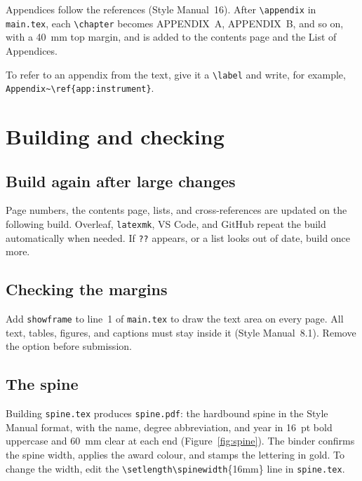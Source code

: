 \documentclass[11pt,a4paper]{article}
\newcommand\cmd[1]{\texttt{\textbackslash #1}}
\newcommand\file[1]{\texttt{#1}}
\begin{document}
Appendices follow the references (Style Manual~16). After \cmd{appendix} in
\file{main.tex}, each \cmd{chapter} becomes APPENDIX~A, APPENDIX~B, and so on,
with a 40~mm top margin, and is added to the contents page and the List of
Appendices.

\begin{code}
\appendix

\end{code}

To refer to an appendix from the text, give it a \cmd{label} and write, for
example, \texttt{Appendix\textasciitilde\textbackslash ref\{app:instrument\}}.

\section{Building and checking}\label{sec:build}

\subsection{Build again after large changes}

Page numbers, the contents page, lists, and cross-references are updated on the
following build. Overleaf, \texttt{latexmk}, VS Code, and GitHub repeat the
build automatically when needed. If \texttt{??} appears, or a list looks out of
date, build once more.

\subsection{Checking the margins}

Add \texttt{showframe} to line~1 of \file{main.tex} to draw the text area on
every page. All text, tables, figures, and captions must stay inside it
(Style Manual~8.1). Remove the option before submission.

\subsection{The spine}

Building \file{spine.tex} produces \file{spine.pdf}: the hardbound spine in the
Style Manual format, with the name, degree abbreviation, and year in 16~pt
bold uppercase and 60~mm clear at each end (Figure~\ref{fig:spine}). The binder
confirms the spine width, applies the award colour, and stamps the lettering in
gold. To change the width, edit the \cmd{setlength}\cmd{spinewidth}\{16mm\}
line in \file{spine.tex}.
\end{document}
